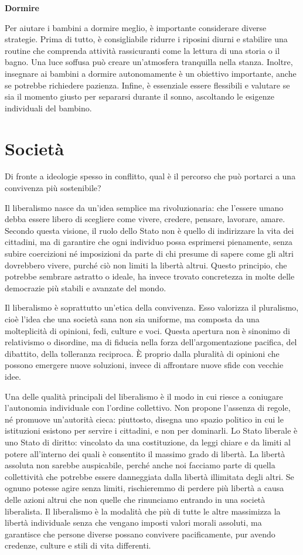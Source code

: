 \documentclass[12pt]{book} %
\begin{document}
\textbf{Dormire}

Per aiutare i bambini a dormire meglio, è importante considerare diverse strategie. Prima di tutto, è consigliabile
ridurre i riposini diurni e stabilire una routine che comprenda attività rassicuranti come la lettura di una storia o
il bagno. Una luce soffusa può creare un'atmosfera tranquilla nella stanza. Inoltre, insegnare ai bambini a dormire
autonomamente è un obiettivo importante, anche se potrebbe richiedere pazienza. Infine, è essenziale essere flessibili
e valutare se sia il momento giusto per separarsi durante il sonno, ascoltando le esigenze individuali del bambino.

\clearpage\section{Società}
Di fronte a ideologie spesso in conflitto, qual è il percorso che può portarci a una convivenza più sostenibile?

Il liberalismo nasce da un’idea semplice ma rivoluzionaria: che l’essere umano debba essere libero di scegliere come vivere, credere, pensare, lavorare, amare. Secondo questa visione, il ruolo dello Stato non è quello di indirizzare la vita dei cittadini, ma di garantire che ogni individuo possa esprimersi pienamente, senza subire coercizioni né imposizioni da parte di chi presume di sapere come gli altri dovrebbero vivere, purché ciò non limiti la libertà altrui. Questo principio, che potrebbe sembrare astratto o ideale, ha invece trovato concretezza in molte delle democrazie più stabili e avanzate del mondo.

Il liberalismo è soprattutto un’etica della convivenza. Esso valorizza il pluralismo, cioè l’idea che una società sana non sia uniforme, ma composta da una molteplicità di opinioni, fedi, culture e voci. Questa apertura non è sinonimo di relativismo o disordine, ma di fiducia nella forza dell’argomentazione pacifica, del dibattito, della tolleranza reciproca. È proprio dalla pluralità di opinioni che possono emergere nuove soluzioni, invece di affrontare nuove sfide con vecchie idee.

Una delle qualità principali del liberalismo è il modo in cui riesce a coniugare l'autonomia individuale con l'ordine collettivo. Non propone l’assenza di regole, né promuove un’autorità cieca: piuttosto, disegna uno spazio politico in cui le istituzioni esistono per servire i cittadini, e non per dominarli. Lo Stato liberale è uno Stato di diritto: vincolato da una costituzione, da leggi chiare e da limiti al potere all'interno dei quali è consentito il massimo grado di libertà. La libertà assoluta non sarebbe auspicabile, perché anche noi facciamo parte di quella collettività che potrebbe essere danneggiata dalla libertà illimitata degli altri. Se ognuno potesse agire senza limiti, rischieremmo di perdere più libertà a causa delle azioni altrui che non quelle che rinunciamo entrando in una società liberalista. Il liberalismo è la modalità che più di tutte le altre massimizza la libertà individuale senza che vengano imposti valori morali assoluti, ma garantisce che persone diverse possano convivere pacificamente, pur avendo credenze, culture e stili di vita differenti.
\end{document}
